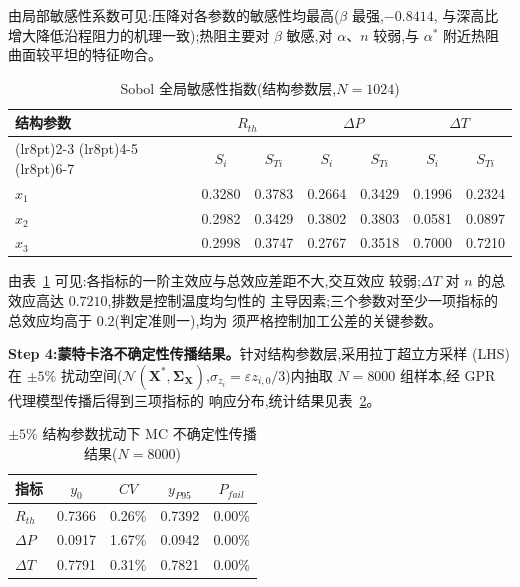 由局部敏感性系数可见:压降对各参数的敏感性均最高($\beta$ 最强,$-0.8414$,
与深高比增大降低沿程阻力的机理一致);热阻主要对 $\beta$ 敏感,对
$\alpha$、$n$ 较弱,与 $\alpha^*$ 附近热阻曲面较平坦的特征吻合。

\begin{table}[htbp]
  \centering
  \caption{Sobol 全局敏感性指数(结构参数层,$N=1024$)}
  \label{tab:sobol}
  \begin{tabular}{lcccccc}
    \toprule
    \multirow{2}{*}{结构参数} & \multicolumn{2}{c}{$R_{th}$} & \multicolumn{2}{c}{$\Delta P$} & \multicolumn{2}{c}{$\Delta T$}                                \\
    \cmidrule(lr{8pt}){2-3} \cmidrule(lr{8pt}){4-5} \cmidrule(lr{8pt}){6-7}
                          & $S_i$                        & $S_{Ti}$                       & $S_i$                          & $S_{Ti}$ & $S_i$  & $S_{Ti}$ \\
    \midrule
    $x_1$                 & 0.3280                       & 0.3783                         & 0.2664                         & 0.3429   & 0.1996 & 0.2324   \\
    $x_2$                 & 0.2982                       & 0.3429                         & 0.3802                         & 0.3803   & 0.0581 & 0.0897   \\
    $x_3$                 & 0.2998                       & 0.3747                         & 0.2767                         & 0.3518   & 0.7000 & 0.7210   \\
    \bottomrule
  \end{tabular}
\end{table}

由表~\ref{tab:sobol} 可见:各指标的一阶主效应与总效应差距不大,交互效应
较弱;$\Delta T$ 对 $n$ 的总效应高达 $0.7210$,排数是控制温度均匀性的
主导因素;三个参数对至少一项指标的总效应均高于 $0.2$(判定准则一),均为
须严格控制加工公差的关键参数。

\textbf{Step 4:蒙特卡洛不确定性传播结果。}针对结构参数层,采用拉丁超立方采样
(LHS)在 $\pm 5\%$ 扰动空间($\mathcal{N}(\mathbf{X}^*,
  \boldsymbol{\Sigma}_{\mathbf{X}})$,$\sigma_{z_i}=\varepsilon
  z_{i,0}/3$)内抽取 $N=8000$ 组样本,经 GPR 代理模型传播后得到三项指标的
响应分布,统计结果见表~\ref{tab:mc-results}。

\begin{table}[htbp]
  \centering
  \caption{$\pm 5\%$ 结构参数扰动下 MC 不确定性传播结果($N=8000$)}
  \label{tab:mc-results}
  \begin{tabular}{lcccc}
    \toprule
    指标         & $y_0$  & $CV$   & $y_{P95}$ & $P_{fail}$ \\
    \midrule
    $R_{th}$   & 0.7366 & 0.26\% & 0.7392    & 0.00\%     \\
    $\Delta P$ & 0.0917 & 1.67\% & 0.0942    & 0.00\%     \\
    $\Delta T$ & 0.7791 & 0.31\% & 0.7821    & 0.00\%     \\
    \bottomrule
  \end{tabular}
\end{table}

